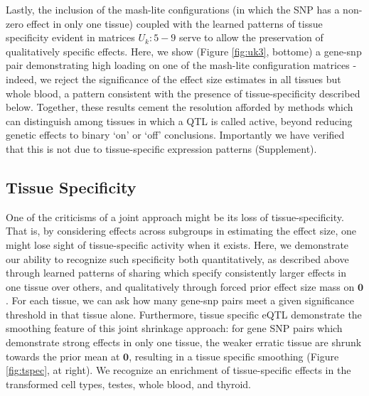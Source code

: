 Lastly, the inclusion of the mash-lite configurations (in which the SNP has a non-zero effect in only one tissue) coupled with the learned patterns of tissue specificity evident in matrices $U_{k}: 5-9$ serve to allow the preservation of qualitatively specific effects. Here, we show (Figure \ref{fig:uk3}, bottome) a gene-snp pair demonstrating high loading on one of the mash-lite configuration matrices - indeed, we reject the significance of the effect size estimates in all tissues but whole blood,  a pattern consistent with the presence of tissue-specificity described below. Together, these results cement the resolution afforded by methods which can distinguish among tissues in which a QTL is called active, beyond reducing genetic effects to binary `on' or `off' conclusions. Importantly we have verified that this is not due to tissue-specific expression patterns (Supplement). %


\subsection{Tissue Specificity}\label{ssec:tissuespec}

One of the criticisms of a joint approach might be its loss of tissue-specificity. That is, by considering effects across subgroups in estimating the effect size, one might lose sight of tissue-specific activity when it exists. Here, we demonstrate our ability to recognize such specificity both quantitatively, as described above through learned patterns of sharing which specify consistently larger effects in one tissue over others, and qualitatively through forced prior effect size mass on $\bm{0}$.  For each tissue, we can ask how many gene-snp pairs meet a given significance threshold in that tissue alone. Furthermore, tissue specific eQTL demonstrate the smoothing feature of this joint shrinkage approach: for gene SNP pairs which demonstrate strong effects in only one tissue, the weaker erratic tissue are shrunk towards the prior mean at $\bm{0}$, resulting in a tissue specific smoothing (Figure \ref{fig:tspec}, at right). We recognize an enrichment of tissue-specific effects in the transformed cell types, testes, whole blood, and thyroid. 



